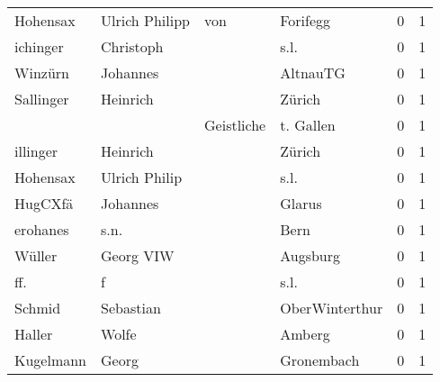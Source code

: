\begin{tabular}{llllrr}
                 Hohensax &                     Ulrich Philipp &         von &                                    Forifegg &          0 &         1 \\
                 ichinger &                          Christoph &             &                                        s.l. &          0 &         1 \\
                  Winzürn &                           Johannes &             &                                    AltnauTG &          0 &         1 \\
                Sallinger &                           Heinrich &             &                                      Zürich &          0 &         1 \\
                          &                                    &  Geistliche &                                   t. Gallen &          0 &         1 \\
                 illinger &                           Heinrich &             &                                      Zürich &          0 &         1 \\
                 Hohensax &                      Ulrich Philip &             &                                        s.l. &          0 &         1 \\
                  HugCXfä &                           Johannes &             &                                      Glarus &          0 &         1 \\
                 erohanes &                               s.n. &             &                                        Bern &          0 &         1 \\
                   Wüller &                          Georg VIW &             &                                    Augsburg &          0 &         1 \\
                      ff. &                                  f &             &                                        s.l. &          0 &         1 \\
                   Schmid &                          Sebastian &             &                              OberWinterthur &          0 &         1 \\
                   Haller &                              Wolfe &             &                                      Amberg &          0 &         1 \\
                Kugelmann &                              Georg &             &                                  Gronembach &          0 &         1 \\

\end{tabular}
